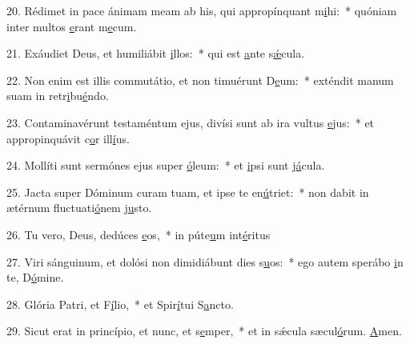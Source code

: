 20. Rédimet in pace ánimam meam ab his, qui appropínquant m\uline{i}hi:~* quóniam inter multos \uline{e}rant m\uline{e}cum.\par 
21. Exáudiet Deus, et humiliábit \uline{i}llos:~* qui est \uline{a}nte s\uline{ǽ}cula.\par 
22. Non enim est illis commutátio, et non timuérunt D\uline{e}um:~* exténdit manum suam in retr\uline{i}bu\uline{é}ndo.\par 
23. Contaminavérunt testaméntum ejus, divísi sunt ab ira vultus \uline{e}jus:~* et appropinquávit c\uline{o}r ill\uline{í}us.\par 
24. Mollíti sunt sermónes ejus super \uline{ó}leum:~* et \uline{i}psi sunt j\uline{á}cula.\par 
25. Jacta super Dóminum curam tuam, et ipse te en\uline{ú}triet:~* non dabit in ætérnum fluctuati\uline{ó}nem j\uline{u}sto.\par 
26. Tu vero, Deus, dedúces \uline{e}os,~* in púte\uline{u}m int\uline{é}ritus\par 
27. Viri sánguinum, et dolósi non dimidiábunt dies s\uline{u}os:~* ego autem sperábo \uline{i}n te, D\uline{ó}mine.\par 
28. Glória Patri, et F\uline{í}lio,~* et Spir\uline{í}tui S\uline{a}ncto.\par 
29. Sicut erat in princípio, et nunc, et s\uline{e}mper,~* et in sǽcula sæcul\uline{ó}rum. \uline{A}men.\par 

